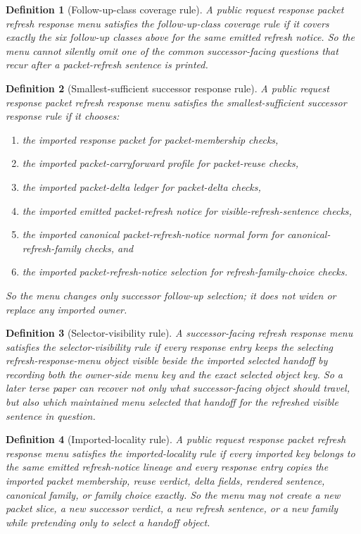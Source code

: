 \documentclass[11pt]{article}
\newtheorem{definition}{Definition}
\begin{document}
\begin{definition}[Follow-up-class coverage rule]
A public request response packet refresh response menu satisfies the \emph{follow-up-class coverage rule} if it covers exactly the six follow-up classes above for the same emitted refresh notice.
So the menu cannot silently omit one of the common successor-facing questions that recur after a packet-refresh sentence is printed.
\end{definition}

\begin{definition}[Smallest-sufficient successor response rule]
A public request response packet refresh response menu satisfies the \emph{smallest-sufficient successor response rule} if it chooses:
\begin{enumerate}[leftmargin=*]
\item the imported response packet for packet-membership checks,
\item the imported packet-carryforward profile for packet-reuse checks,
\item the imported packet-delta ledger for packet-delta checks,
\item the imported emitted packet-refresh notice for visible-refresh-sentence checks,
\item the imported canonical packet-refresh-notice normal form for canonical-refresh-family checks, and
\item the imported packet-refresh-notice selection for refresh-family-choice checks.
\end{enumerate}
So the menu changes only successor follow-up selection; it does not widen or replace any imported owner.
\end{definition}

\begin{definition}[Selector-visibility rule]
A successor-facing refresh response menu satisfies the \emph{selector-visibility rule} if every response entry keeps the selecting refresh-response-menu object visible beside the imported selected handoff by recording both the owner-side menu key and the exact selected object key. So a later terse paper can recover not only what successor-facing object should travel, but also which maintained menu selected that handoff for the refreshed visible sentence in question.
\end{definition}

\begin{definition}[Imported-locality rule]
A public request response packet refresh response menu satisfies the \emph{imported-locality rule} if every imported key belongs to the same emitted refresh-notice lineage and every response entry copies the imported packet membership, reuse verdict, delta fields, rendered sentence, canonical family, or family choice exactly.
So the menu may not create a new packet slice, a new successor verdict, a new refresh sentence, or a new family while pretending only to select a handoff object.
\end{definition}
\end{document}
